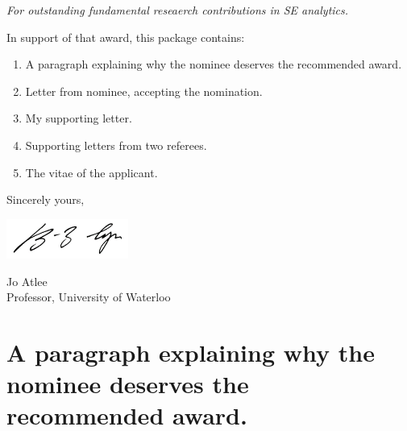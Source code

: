 \documentclass[10pt]{article}
\begin{document}
\begin{mdframed}[hidealllines=true,backgroundcolor=blue!10]
\begin{center}
{\em For outstanding fundamental reseaerch contributions in SE analytics.}
\end{center}
\end{mdframed}
 
In support of that award, this package contains:

\begin{enumerate}
\item
A paragraph explaining why the nominee deserves the recommended award.
\item
Letter from nominee, accepting the nomination.
\item
My supporting letter.
\item
Supporting letters from two referees.
\item
The vitae of the applicant.
\end{enumerate}


Sincerely yours,

\includegraphics[width=4cm]{msig.png} %



Jo Atlee\\
Professor, University of Waterloo

\newpage
\section{A paragraph explaining why the nominee deserves the recommended award.}
\end{document}

